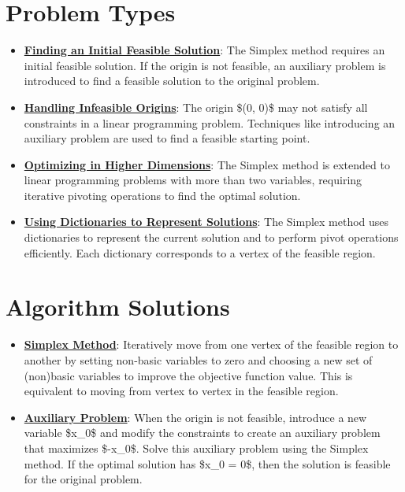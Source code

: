 \documentclass{article}%
\begin{document}
%
\section{Problem Types}%
\label{sec:ProblemTypes}%
\begin{itemize}[leftmargin=*]%
\item \href{https://www.math.purdue.edu/~yipn/421/2024-08-27-ExSimplex.pdf#page=32}{\textbf{Finding an Initial Feasible Solution}}: The Simplex method requires an initial feasible solution. If the origin is not feasible, an auxiliary problem is introduced to find a feasible solution to the original problem.%
\item \href{https://www.math.purdue.edu/~yipn/421/2024-08-27-ExSimplex.pdf#page=30}{\textbf{Handling Infeasible Origins}}: The origin \$(0, 0)\$ may not satisfy all constraints in a linear programming problem. Techniques like introducing an auxiliary problem are used to find a feasible starting point.%
\item \href{https://www.math.purdue.edu/~yipn/421/2024-08-27-ExSimplex.pdf#page=17}{\textbf{Optimizing in Higher Dimensions}}: The Simplex method is extended to linear programming problems with more than two variables, requiring iterative pivoting operations to find the optimal solution.%
\item \href{https://www.math.purdue.edu/~yipn/421/2024-08-27-ExSimplex.pdf#page=26}{\textbf{Using Dictionaries to Represent Solutions}}: The Simplex method uses dictionaries to represent the current solution and to perform pivot operations efficiently. Each dictionary corresponds to a vertex of the feasible region.%
\end{itemize}

%
\section{Algorithm Solutions}%
\label{sec:AlgorithmSolutions}%
\begin{itemize}[leftmargin=*]%
\item \href{https://www.math.purdue.edu/~yipn/421/2024-08-27-ExSimplex.pdf#page=6}{\textbf{Simplex Method}}: Iteratively move from one vertex of the feasible region to another by setting non-basic variables to zero and choosing a new set of (non)basic variables to improve the objective function value. This is equivalent to moving from vertex to vertex in the feasible region.%
\item \href{https://www.math.purdue.edu/~yipn/421/2024-08-27-ExSimplex.pdf#page=32}{\textbf{Auxiliary Problem}}: When the origin is not feasible, introduce a new variable \$x_0\$ and modify the constraints to create an auxiliary problem that maximizes \$-x_0\$. Solve this auxiliary problem using the Simplex method. If the optimal solution has \$x_0 = 0\$, then the solution is feasible for the original problem.%
\end{itemize}

%
\end{document}
